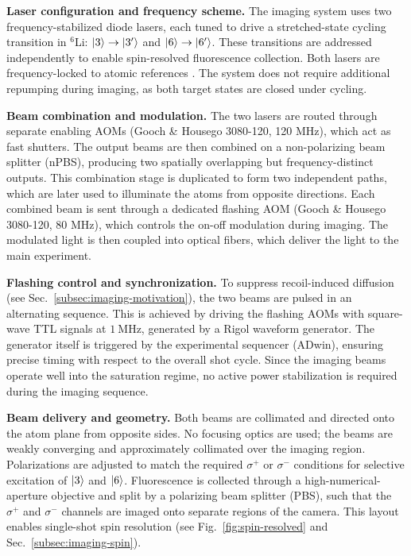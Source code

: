 


\textbf{Laser configuration and frequency scheme.}  
The imaging system uses two frequency-stabilized diode lasers, each tuned to drive a stretched-state cycling transition in ${}^6$Li: $\left| 3 \right\rangle \rightarrow \left| 3' \right\rangle$ and $\left| 6 \right\rangle \rightarrow \left| 6' \right\rangle$. These transitions are addressed independently to enable spin-resolved fluorescence collection. Both lasers are frequency-locked to atomic references . The system does not require additional repumping during imaging, as both target states are closed under cycling.

\textbf{Beam combination and modulation.}  
The two lasers are routed through separate enabling AOMs (Gooch \& Housego 3080-120, 120 MHz), which act as fast shutters. The output beams are then combined on a non-polarizing beam splitter (nPBS), producing two spatially overlapping but frequency-distinct outputs. This combination stage is duplicated to form two independent paths, which are later used to illuminate the atoms from opposite directions. Each combined beam is sent through a dedicated flashing AOM (Gooch \& Housego 3080-120, 80 MHz), which controls the on-off modulation during imaging. The modulated light is then coupled into optical fibers, which deliver the light to the main experiment.

\textbf{Flashing control and synchronization.}  
To suppress recoil-induced diffusion (see Sec.~\ref{subsec:imaging-motivation}), the two beams are pulsed in an alternating sequence. This is achieved by driving the flashing AOMs with square-wave TTL signals at $1~\mathrm{MHz}$, generated by a Rigol waveform generator. The generator itself is triggered by the experimental sequencer (ADwin), ensuring precise timing with respect to the overall shot cycle. Since the imaging beams operate well into the saturation regime, no active power stabilization is required during the imaging sequence.

\textbf{Beam delivery and geometry.}  
Both beams are collimated and directed onto the atom plane from opposite sides. No focusing optics are used; the beams are weakly converging and approximately collimated over the imaging region. Polarizations are adjusted to match the required $\sigma^+$ or $\sigma^-$ conditions for selective excitation of $\left| 3 \right\rangle$ and $\left| 6 \right\rangle$. Fluorescence is collected through a high-numerical-aperture objective and split by a polarizing beam splitter (PBS), such that the $\sigma^+$ and $\sigma^-$ channels are imaged onto separate regions of the camera. This layout enables single-shot spin resolution (see Fig.~\ref{fig:spin-resolved} and Sec.~\ref{subsec:imaging-spin}).


